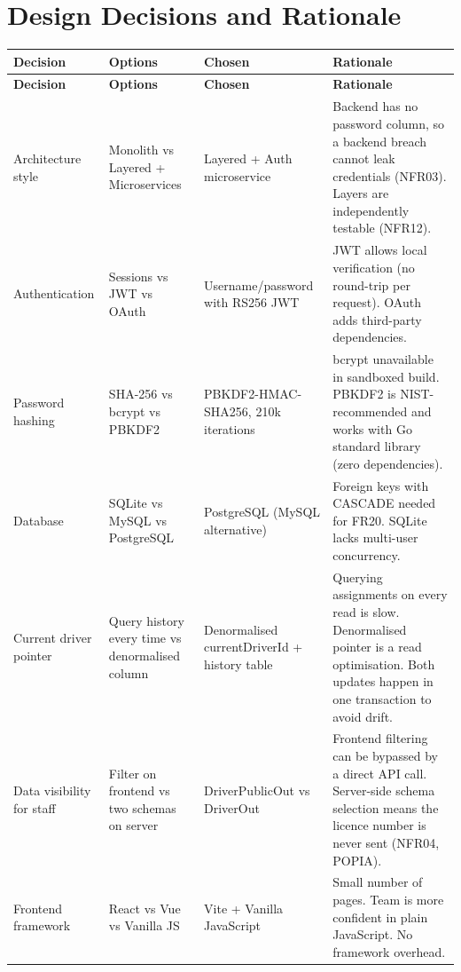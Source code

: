 \documentclass[11pt,a4paper]{article}
\begin{document}
\section{Design Decisions and Rationale}

\begin{longtable}{|p{2.5cm}|p{3.5cm}|p{2.5cm}|p{5cm}|}
\hline
\textbf{Decision} & \textbf{Options} & \textbf{Chosen} & \textbf{Rationale} \\
\hline
\endfirsthead
\hline
\textbf{Decision} & \textbf{Options} & \textbf{Chosen} & \textbf{Rationale} \\
\hline
\endhead
Architecture style & Monolith vs Layered + Microservices & Layered + Auth microservice & Backend has no password column, so a backend breach cannot leak credentials (NFR03). Layers are independently testable (NFR12). \\
\hline
Authentication & Sessions vs JWT vs OAuth & Username/password with RS256 JWT & JWT allows local verification (no round-trip per request). OAuth adds third-party dependencies. \\
\hline
Password hashing & SHA-256 vs bcrypt vs PBKDF2 & PBKDF2-HMAC-SHA256, 210k iterations & bcrypt unavailable in sandboxed build. PBKDF2 is NIST-recommended and works with Go standard library (zero dependencies). \\
\hline
Database & SQLite vs MySQL vs PostgreSQL & PostgreSQL (MySQL alternative) & Foreign keys with CASCADE needed for FR20. SQLite lacks multi-user concurrency. \\
\hline
Current driver pointer & Query history every time vs denormalised column & Denormalised currentDriverId + history table & Querying assignments on every read is slow. Denormalised pointer is a read optimisation. Both updates happen in one transaction to avoid drift. \\
\hline
Data visibility for staff & Filter on frontend vs two schemas on server & DriverPublicOut vs DriverOut & Frontend filtering can be bypassed by a direct API call. Server-side schema selection means the licence number is never sent (NFR04, POPIA). \\
\hline
Frontend framework & React vs Vue vs Vanilla JS & Vite + Vanilla JavaScript & Small number of pages. Team is more confident in plain JavaScript. No framework overhead. \\
\hline
\end{longtable}

\end{document}
